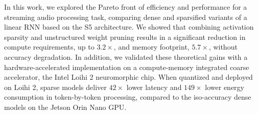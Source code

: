 

In this work, we explored the Pareto front of efficiency and performance for a streaming audio processing task, comparing dense and sparsified variants of a linear RNN based on the S5 architecture.
We showed that combining activation sparsity and unstructured weight pruning results in a significant reduction in compute requirements, up to $3.2\times$, and memory footprint, $5.7\times$, without accuracy degradation.
In addition, we validated these theoretical gains with a hardware-accelerated implementation on a compute-memory integrated coarse accelerator, the Intel Loihi 2 neuromorphic chip.
When quantized and deployed on Loihi 2, sparse models deliver $42 \times$ lower latency and $149\times$ lower energy consumption in token-by-token processing, compared to the iso-accuracy dense models on the Jetson Orin Nano GPU.

%
%
%

